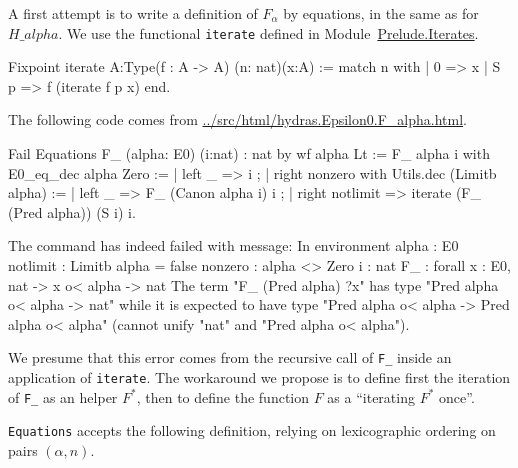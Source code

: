 \documentclass[a4paper]{book}
\begin{document}
A first attempt is to write a definition of $F_\alpha$ by equations, in the same as for $H\_alpha$.  We use the functional \texttt{iterate} defined in 
Module~\href{../src/html/hydras.Prelude.Iterates.html\#iterate}{Prelude.Iterates}.

\begin{Coqsrc}
Fixpoint iterate {A:Type}(f : A -> A) (n: nat)(x:A) :=
  match n with
  | 0 => x
  | S p => f (iterate  f p x)
  end.
\end{Coqsrc}

The following code comes from 
 \url{../src/html/hydras.Epsilon0.F_alpha.html}.


\begin{Coqsrc}
Fail Equations F_ (alpha: E0) (i:nat) :  nat  by wf  alpha Lt :=
  F_ alpha  i with E0_eq_dec alpha Zero :=
    { | left _ =>  i ;
      | right nonzero
          with Utils.dec (Limitb alpha) :=
          { | left _ =>  F_ (Canon alpha i)  i ;
            | right notlimit =>  iterate (F_ (Pred alpha))  (S i) i}}.
\end{Coqsrc}

\begin{Coqanswer}
The command has indeed failed with message:
In environment
alpha : E0
notlimit : Limitb alpha = false
nonzero : alpha <> Zero
i : nat
F_ : forall x : E0, nat -> x o< alpha -> nat
The term "F_ (Pred alpha) ?x" has type "Pred alpha o< alpha -> nat"
while it is expected to have type "Pred alpha o< alpha -> Pred alpha o< alpha"
(cannot unify "nat" and "Pred alpha o< alpha").
\end{Coqanswer}


We presume that this error comes from the recursive call of \texttt{F\_} inside
an application of \texttt{iterate}. The workaround we propose is to define first 
the iteration of \texttt{F\_}  as an helper $F^*$, then to define the function $F$ as a ``iterating $F^*$ once''.

\texttt{Equations} accepts the following definition, relying on  lexicographic ordering on pairs $(\alpha,n)$.


\label{sect:F-equations}

\label{Functions:F-alpha}
  
\end{document}
